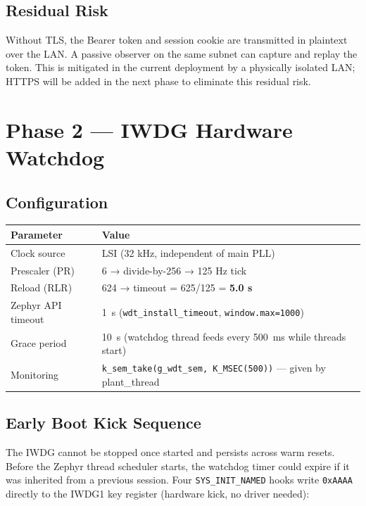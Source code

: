\documentclass[11pt,a4paper]{article}
\begin{document}
\subsection{Residual Risk}

Without TLS, the Bearer token and session cookie are transmitted in plaintext over the LAN.
A passive observer on the same subnet can capture and replay the token.
This is mitigated in the current deployment by a physically isolated LAN; HTTPS will
be added in the next phase to eliminate this residual risk.

\section{Phase 2 — IWDG Hardware Watchdog}

\subsection{Configuration}

\begin{center}
\begin{tabular}{@{}ll@{}}
\toprule
\textbf{Parameter} & \textbf{Value} \\
\midrule
Clock source       & LSI (32 kHz, independent of main PLL) \\
Prescaler (PR)     & 6 → divide-by-256 → 125 Hz tick \\
Reload (RLR)       & 624 → timeout = 625/125 = \textbf{5.0 s} \\
Zephyr API timeout & 1~s (\texttt{wdt\_install\_timeout}, \texttt{window.max=1000}) \\
Grace period       & 10~s (watchdog thread feeds every 500~ms while threads start) \\
Monitoring         & \texttt{k\_sem\_take(g\_wdt\_sem, K\_MSEC(500))} — given by plant\_thread \\
\bottomrule
\end{tabular}
\end{center}

\subsection{Early Boot Kick Sequence}

The IWDG cannot be stopped once started and persists across warm resets.
Before the Zephyr thread scheduler starts, the watchdog timer could expire if it was inherited
from a previous session. Four \texttt{SYS\_INIT\_NAMED} hooks write \texttt{0xAAAA} directly
to the IWDG1 key register (hardware kick, no driver needed):
\end{document}
